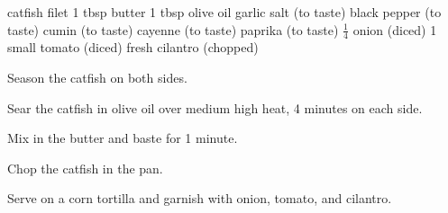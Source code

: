 \dishtype{\main}
\begin{ingreds}
     catfish filet
        1 tbsp butter
        1 tbsp olive oil
        garlic salt (to taste)
        black pepper (to taste)
        cumin (to taste)
        cayenne (to taste)
        paprika (to taste)
    \ingredients[Garnish]
        $\frac{1}{4}$ onion (diced)
        1 small tomato (diced)
        fresh cilantro (chopped)
\end{ingreds}
\begin{method}
    Season the catfish on both sides.\par
    Sear the catfish in olive oil over medium high heat, 4 minutes on each side.\par
    Mix in the butter and baste for 1 minute.\par
    Chop the catfish in the pan.\par
    Serve on a corn tortilla and garnish with onion, tomato, and cilantro.
\end{method}